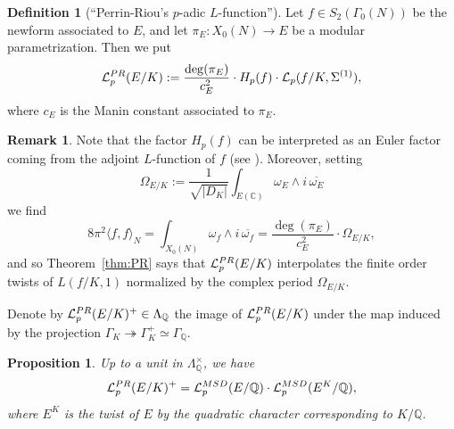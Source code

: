 \documentclass[a4paper,10pt]{amsart}
\numberwithin{equation}{section}
\numberwithin{equation}{section}
\theoremstyle{plain}
\theoremstyle{definition}
\newtheorem{defi}[thm]{Definition}
\newtheorem{rem}[thm]{Remark}
\theoremstyle{definition}
\theoremstyle{plain}
\newtheorem{prop}[thm]{Proposition}
\theoremstyle{plain}
\theoremstyle{plain}
\theoremstyle{plain}
\newcommand{\Q}{\mathbb{Q}}
\newcommand{\C}{\mathbb{C}}
\newcommand{\Lcal}{\mathcal{L}}
\begin{document}
\begin{defi}[``Perrin-Riou's $p$-adic $L$-function'']\label{def:PR}
Let $f\in S_2(\Gamma_0(N))$ be the newform associated to $E$, and let $\pi_E:X_0(N)\rightarrow E$ be a modular parametrization. Then we
put
\[
\Lcal_p^{\rm PR}(E/K):=\frac{\deg(\pi_E)}{c_E^2}\cdot H_p(f)\cdot \Lcal_p(f/K,\Sigma^{(1)}),\nonumber
\]
where $c_E$ is the Manin constant associated to $\pi_E$.
\end{defi}



\begin{rem}\label{rem:periods}
Note that the factor $H_p(f)$ can be interpreted as an Euler factor coming from the adjoint $L$-function of $f$ (see \cite[Rem.~6.5.10]{KLZ-AJM}). Moreover, setting 
\[
\Omega_{E/K}:=\frac{1}{\sqrt{\vert D_K\vert}}\int_{E(\C)}\omega_E\wedge i\,\overline{\omega_E}
\]
we find
\[
8\pi^2\langle f,f\rangle_N=\int_{X_0(N)}\omega_f\wedge i\,\overline{\omega_f}
=\frac{\deg(\pi_E)}{c_E^2}\cdot\Omega_{E/K},
\]
and so Theorem~\ref{thm:PR} says that $\Lcal_p^{\rm PR}(E/K)$ interpolates the finite order twists of $L(f/K,1)$ normalized by the complex period $\Omega_{E/K}$.
\end{rem}


Denote by $\Lcal^{\rm PR}_p(E/K)^+\in\Lambda_\Q$ the image of $\Lcal^{\rm PR}_p(E/K)$ under the map induced by the projection $\Gamma_K\twoheadrightarrow\Gamma_K^+\simeq\Gamma_\Q$.

\begin{prop}
\label{prop:comp-Lcyc}
Up to a unit in $\Lambda_\Q^\times$, we have 
\[
\Lcal_p^{\rm PR}(E/K)^+=\Lcal_p^{\rm MSD}(E/\Q)\cdot\Lcal^{\rm MSD}_p(E^K/\Q),
\] 
where $E^K$ is the twist of $E$ by the quadratic character corresponding to $K/\Q$.
\end{prop}
\end{document}
